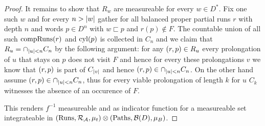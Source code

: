 \begin{proof}
  It remains to show that $R_{w}$ are measureable for every $w\in D^{*}$. Fix
  one such $w$ and for every $n>\left\vert{w}\right\vert$ gather for all balanced proper
  partial runs $r$ with depth $n$ and words $p\in D^{n}$ with $w\sqsubset p$
  and $r(p)\notin F$. The countable union of all such $\operatorname{compRuns}(r)$ and
  $\operatorname{cyl}(p)$ is collected in $C_{n}$ and we claim that
  $R_{u} = \cap_{\left\vert{u}\right\vert<n}C_{n}$ by the following argument: for any
  $\left(r,p\right)\in R_{u}$ every prolongation of $u$ that stays on $p$ does not
  visit $F$ and hence for every these prolongations $v$ we know that
  $\left(r,p\right)$ is part of $C_{\left\vert{v}\right\vert}$ and hence
  $\left(r,p\right)\in\cap_{\left\vert{u}\right\vert<n}C_{n}$. On the other hand assume
  $\left(r,p\right)\in\cap_{\left\vert{u}\right\vert<n}C_{n}$, thus for every viable prolongation
  of length $k$ for $u$ $C_{k}$ witnesses the absence of an occurence of $F$.
  
  This renders $f^{-1}$ measureable and as indicator function for a measureable 
  set integrateable in $\left(\operatorname{Runs}, \mathcal{R}_{\mathcal{A}},\mu_{t}\right)\otimes
  \left(\operatorname{Paths}, \mathcal{B}(D), \mu_{B}\right)$.
\end{proof}

